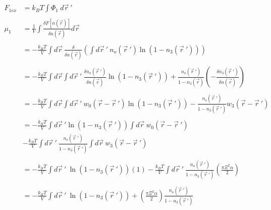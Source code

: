 \documentclass[double,12pt]{beavtex}
\begin{document}
\begin{align}
    F_{1ex} &= k_BT\int \Phi_1~d\vec r~' \\ \nonumber\\
    \mu_1 &= \frac{1}{V}\int \frac{\delta F[n(\vec r)]}{\delta n(\vec r)} d\vec r \\ \nonumber\\
%
        &= -\frac{k_BT}{V} \int d\vec r ~\frac{\delta}
        {\delta n(\vec r)}\left(\int d\vec r~'~n_o(\vec r~')\ln(1-n_3(\vec r~'))\right) \\ \nonumber\\
%
        &= -\frac{k_BT}{V}\int d\vec r\int d\vec r~'~\frac{\delta n_o(\vec r~')}
        {\delta n(\vec r)}\ln(1-n_3(\vec r~'))+\frac{n_o(\vec r~')}
          {1-n_3(\vec r)}\left(-\frac{\delta n_3(\vec r~')}{\delta n(\vec r)}
          \right) \\ \nonumber\\
%
        &= -\frac{k_BT}{V} \int d\vec r \int d\vec r~' ~w_0(\vec r - \vec r~')
          \ln(1-n_3(\vec r~')) - \frac{n_o(\vec r~')}
          {1-n_3(\vec r~')}w_3(\vec r - \vec r~') \\ \nonumber\\
%
        &= -\frac{k_BT}{V} \int d\vec r~'\ln(1-n_3(\vec r~')) \int d \vec r  
          ~w_0(\vec r - \vec r~') \nonumber\\
        &- \frac{k_BT}{V} \int d\vec r~' ~\frac{n_o(\vec r~')}{1-n_3(\vec r~')} 
          \int d \vec r~w_3(\vec r - \vec r~')  \\ \\
%
        &= -\frac{k_BT}{V} \int d\vec r~' ~\ln(1-n_3(\vec r~'))(1)
          - \frac{k_BT}{V} \int d\vec r~' ~\frac{n_o(\vec r~')}{1-n_3(\vec r~')}
          \left(\frac{\pi\Xi^2\alpha}{2}\right) \\ \\
%
        &= -\frac{k_BT}{V}\int d\vec r~'~ \ln(1-n_3(\vec r~'))+\left(
        \frac{\pi\Xi^2\alpha}{2}\right)\frac{n_o(\vec r~')}{1-n_3(\vec r~')}
\end{align}
\end{document}
